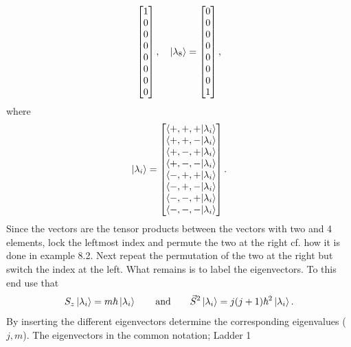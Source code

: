 \begin{example}
\begin{equation}
\begin{bmatrix}
			1 \\
			0 \\
			0 \\
			0 \\
			0 \\
			0 \\
			0 \\
			0 \\
		\end{bmatrix},\quad \ket{\lambda_8}=
		\begin{bmatrix}
			0 \\
			0 \\
			0 \\
			0 \\
			0 \\
			0 \\
			0 \\
			1 \\
		\end{bmatrix},	
	\end{equation} 
	where
	\begin{equation}
		\ket{\lambda_i}=\begin{bmatrix}
			\braket{+,+,+|\lambda_i} \\
			\braket{+,+,-|\lambda_i} \\
			\braket{+,-,+|\lambda_i} \\
			\braket{+,-,-|\lambda_i} \\
			\braket{-,+,+|\lambda_i} \\
			\braket{-,+,-|\lambda_i} \\
			\braket{-,-,+|\lambda_i} \\
			\braket{-,-,-|\lambda_i} \\
		\end{bmatrix}.
	\end{equation} 
	Since the vectors are the tensor products between the vectors with two and 4 elements, lock the leftmost index and permute the two at the right cf. how it is done in example 8.2. Next repeat the permutation of the two at the right but switch the index at the left. What remains is to label the eigenvectors. To this end use that
	\begin{equation}
		S_z\ket{\lambda_i}=m\hbar\ket{\lambda_i} \qquad \mbox{and} \qquad \vec{S}^2\ket{\lambda_i}=j(j+1)\hbar^2\ket{\lambda_i}.
	\end{equation} 
	By inserting the different eigenvectors determine the corresponding eigenvalues ($j,m$). The eigenvectors in the common notation; Ladder 1
	\begin{equation}

\end{equation}
\end{example}
